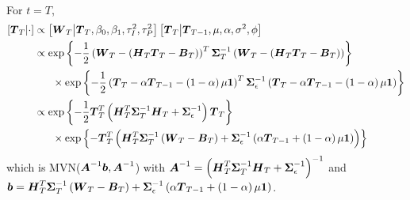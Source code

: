 \documentclass{article}\usepackage[]{graphicx}\usepackage[]{color}
\def\bm#1{\mbox{\boldmath $#1$}}
\begin{document}
\\
%
For $t = T$,
%
\begin{align*}
%
\left[ \bm{T}_T \middle| \cdot \right] & \propto \left[ \bm{W}_T \middle| \bm{T}_T, \beta_0, \beta_1, \tau^2_I, \tau^2_P \right] \left[ \bm{T}_T \middle| \bm{T}_{T - 1}, \mu, \alpha, \sigma^2, \phi \right] \\
%
& \propto \exp{ \left\{ - \frac{1} {2} \left( \bm{W}_T - \left( \bm{H}_T \bm{T}_T - \bm{B}_T \right) \right)^T \bm{\Sigma}_T^{ - 1} \left( \bm{W}_T - \left( \bm{H}_T \bm{T}_T - \bm{B}_T \right)  \right) \right\} }\\
& \hspace{6mm} \times \exp{ \left\{ - \frac{1} {2} \left( \bm{T}_T - \alpha \bm{T}_{T - 1} - \left( 1 - \alpha \right) \mu \bm{1} \right)^T \bm{\Sigma}_\epsilon^{ - 1} \left( \bm{T}_T - \alpha \bm{T}_{T - 1} - \left( 1 - \alpha \right) \mu \bm{1} \right) \right\} }\\
%
& \propto \exp{ \left\{ - \frac{1} {2} \bm{T}_T^T \left(\bm{H}_T^T \bm{\Sigma}_T^{ - 1} \bm{H}_T +  \bm{\Sigma}_\epsilon^{ - 1} \right) \bm{T}_T \right\} }\\
& \hspace{6mm} \times \exp{ \left\{ - \bm{T}_T^T \left( \bm{H}_T^T \bm{\Sigma}_T^{ - 1} \left( \bm{W}_T - \bm{B}_T \right) + \bm{\Sigma}_\epsilon^{ - 1} \left( \alpha \bm{T}_{T - 1} + \left( 1 - \alpha \right) \mu \bm{1} \right) \right) \right\} }
%
\end{align*}
%
which is MVN($\bm{A}^{ - 1}\bm{b}, \bm{A}^{ - 1}$) with $\bm{A}^{ - 1} = \left( \bm{H}_T^T \bm{\Sigma}_T^{ - 1} \bm{H}_T +  \bm{\Sigma}_\epsilon^{ - 1} \right)^{ - 1}$ and $\bm{b} =  \bm{H}_T^T \bm{\Sigma}_T^{ - 1} \left( \bm{W}_T - \bm{B}_T \right) + \bm{\Sigma}_\epsilon^{ - 1} \left( \alpha \bm{T}_{T - 1} + \left( 1 - \alpha \right) \mu \bm{1} \right)$.
%
%
\end{document}
